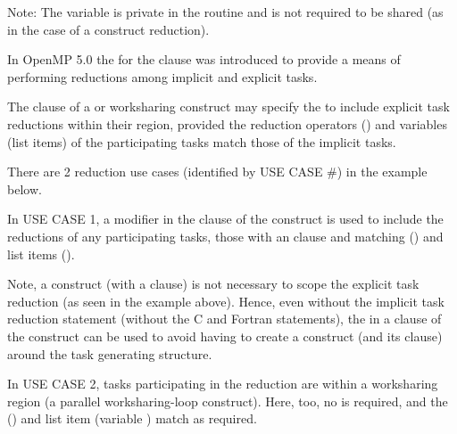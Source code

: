 Note: The  variable is private in the  routine
and is not required to be shared (as in the case of a  construct
reduction).




In OpenMP 5.0 the   for the  clause was
introduced to provide a means of performing reductions among implicit and explicit tasks.

The  clause of a  or worksharing construct may
specify the   to include explicit task reductions
within their region, provided the reduction operators ()
and variables (list items) of the participating tasks match those of the
implicit tasks.

There are 2 reduction use cases (identified by USE CASE \#) in the  example below.  

In USE CASE 1, a  modifier in the  clause
of the  construct is used to include the reductions of any 
participating tasks, those with an  clause and matching 
 (\kcode{+}) and list items ().  

Note, a  construct (with a  clause) is not
necessary to scope the explicit task reduction (as seen in the example above). 
Hence, even without the implicit task reduction statement (without the C   
and Fortran  statements), the   
in a  clause of the  construct
can be used to avoid having to create a  construct 
(and its  clause) around the task generating structure.

In USE CASE 2, tasks participating in the reduction are within a
worksharing region (a parallel worksharing-loop construct).
Here, too, no  is required, and the  (\kcode{+})
and list item (variable ) match as required.





